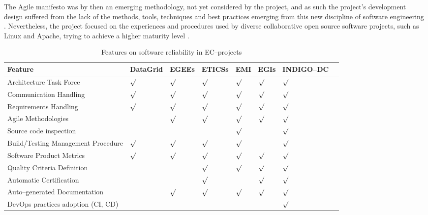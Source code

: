 \documentclass[journal]{IEEEtran}
\begin{document}
The Agile manifesto \cite{agile-manifesto} was by then an emerging methodology, not yet
considered by the project, and as such the project's
development design suffered from the lack of the methods, tools, techniques and best
practices emerging from this new discipline of software engineering
\cite{agile}. Nevertheless, the project focused on the experiences and procedures
used by diverse collaborative open source software projects, such as Linux and Apache, trying to
achieve a higher maturity level \cite{cmm}.

\begin{table}[!h]
\renewcommand{\arraystretch}{1.3}
\caption{Features on software reliability in EC--projects}
\label{tab:feat}
\centering
\begin{tabular}{llllllll}
\hline
\hline
Feature & DataGrid & EGEEs & ETICSs & EMI & EGIs & INDIGO--DC\\
\hline
\hline
Architecture Task Force            &$\surd$&$\surd$&$\surd$&$\surd$&$\surd$&$\surd$\\
Communication Handling             &$\surd$&$\surd$&$\surd$&$\surd$&$\surd$&$\surd$\\
Requirements Handling              &$\surd$&$\surd$&$\surd$&$\surd$&$\surd$&$\surd$\\
Agile Methodologies                &       &$\surd$&$\surd$&$\surd$&$\surd$&$\surd$\\
Source code inspection             &       &       &       &$\surd$&       &$\surd$\\
Build/Testing Management Procedure &$\surd$&$\surd$&$\surd$&$\surd$&       &$\surd$\\
Software Product Metrics           &$\surd$&$\surd$&$\surd$&$\surd$&$\surd$&$\surd$\\
Quality Criteria Definition        &       &       &$\surd$&$\surd$&$\surd$&$\surd$\\
Automatic Certification            &       &       &$\surd$&       &$\surd$&$\surd$\\
Auto--generated Documentation      &       &$\surd$&$\surd$&$\surd$&$\surd$&$\surd$\\
DevOps practices adoption (CI, CD) &       &       &       &       &       &$\surd$\\
\hline
\hline
\end{tabular}
\end{table}
\end{document}

